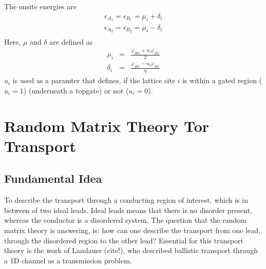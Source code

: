 The onsite energies are
\begin{eqnarray}
\epsilon_{A_1} = \epsilon_{B_1} = \mu_i + \delta_i \\
\epsilon_{A_2} = \epsilon_{B_2} = \mu_i - \delta_i \\
\end{eqnarray}
Here, $\mu$ and $\delta$ are defined as 
\begin{eqnarray}
\mu_i &=& \frac{\varphi_{BG} + u_i \varphi_{SG}}{2} \\
\delta_i &=& \frac{\varphi_{BG} -  u_i \varphi_{SG}}{\eta}
\end{eqnarray}
$u_i$ is used as a paramter that defines, if the lattice site $i$ is within a gated region ($u_i = 1$) (underneath a topgate) or not ($u_i = 0$).

\section{Random Matrix Theory Tor Transport}

\subsection{Fundamental Idea}
To describe the transport through a conducting region of interest, which is in between of two ideal leads. Ideal leads means that there is no disorder present, whereas the conductor is a disordered system. The question that the random matrix theory is answering, is: how can one describe the transport from one lead, through the disordered region to the other lead? Essential for this transport theory is the work of Landauer (cite!), who described ballistic transport through a 1D channel as a transmission problem. 

